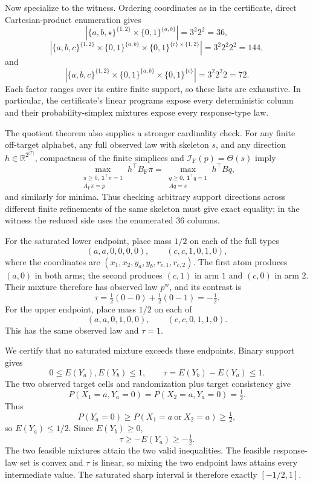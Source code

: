 Now specialize to the witness.  Ordering coordinates as in the certificate, direct Cartesian-product enumeration gives
\[
|\{a,b,\star\}^{\{1,2\}}\times\{0,1\}^{\{a,b\}}|
=3^2 2^2=36,
\]
\[
|\{a,b,c\}^{\{1,2\}}\times\{0,1\}^{\{a,b\}}
\times\{0,1\}^{\{c\}\times\{1,2\}}|
=3^2 2^2 2^2=144,
\]
and
\[
|\{a,b,c\}^{\{1,2\}}\times\{0,1\}^{\{a,b\}}
\times\{0,1\}^{\{c\}}|
=3^2 2^2 2=72.
\]
Each factor ranges over its entire finite support, so these lists are exhaustive.  In particular, the certificate's linear programs expose every deterministic column and their probability-simplex mixtures expose every response-type law.

The quotient theorem also supplies a stronger cardinality check.  For any finite off-target alphabet, any full observed law with skeleton \(s\), and any direction \(h\in\mathbb R^{2^{|\mathcal T|}}\), compactness of the finite simplices and \(\mathcal I_{\mathrm F}(p)=\Theta(s)\) imply
\[
\max_{\substack{\pi\ge0,\ \mathbf 1^\top\pi=1\\A_{\mathrm F}\pi=p}}
h^\top B_{\mathrm F}\pi
=
\max_{\substack{q\ge0,\ \mathbf 1^\top q=1\\Aq=s}}
h^\top Bq,
\]
and similarly for minima.  Thus checking arbitrary support directions across different finite refinements of the same skeleton must give exact equality; in the witness the reduced side uses the enumerated \(36\) columns.

For the saturated lower endpoint, place mass \(1/2\) on each of the full types
\[
(a,a,0,0,0,0),
\qquad
(c,c,1,0,1,0),
\]
where the coordinates are \((x_1,x_2,y_a,y_b,r_{c,1},r_{c,2})\).  The first atom produces \((a,0)\) in both arms; the second produces \((c,1)\) in arm \(1\) and \((c,0)\) in arm \(2\).  Their mixture therefore has observed law \(p^{\mathrm w}\), and its contrast is
\[
\tau=\tfrac12(0-0)+\tfrac12(0-1)=-\tfrac12.
\]
For the upper endpoint, place mass \(1/2\) on each of
\[
(a,a,0,1,0,0),
\qquad
(c,c,0,1,1,0).
\]
This has the same observed law and \(\tau=1\).

We certify that no saturated mixture exceeds these endpoints.  Binary support gives
\[
0\le E(Y_a),E(Y_b)\le1,
\qquad
\tau=E(Y_b)-E(Y_a)\le1.
\]
The two observed target cells and randomization plus target consistency give
\[
P(X_1=a,Y_a=0)=P(X_2=a,Y_a=0)=\tfrac12.
\]
Thus
\[
P(Y_a=0)
\ge P(X_1=a\ \text{or}\ X_2=a)
\ge\tfrac12,
\]
so \(E(Y_a)\le1/2\).  Since \(E(Y_b)\ge0\),
\[
\tau\ge-E(Y_a)\ge-\tfrac12.
\]
The two feasible mixtures attain the two valid inequalities.  The feasible response-law set is convex and \(\tau\) is linear, so mixing the two endpoint laws attains every intermediate value.  The saturated sharp interval is therefore exactly \([-1/2,1]\).

